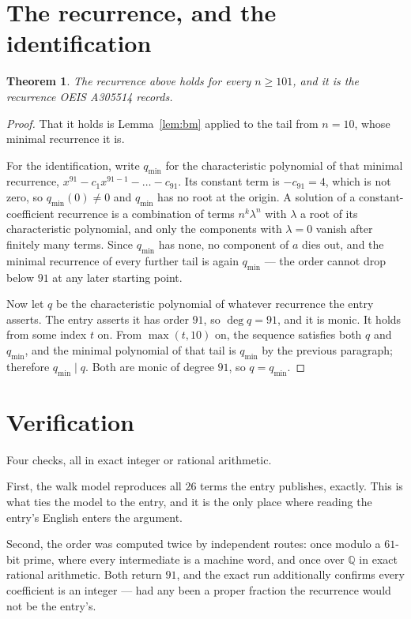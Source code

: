 \documentclass[11pt,a4paper]{article}
\theoremstyle{plain}
\newtheorem{theorem}{Theorem}
\theoremstyle{definition}
\begin{document}
\section{The recurrence, and the identification}

\begin{theorem}
The recurrence above holds for every $n\ge101$, and it is the recurrence OEIS A305514 records.
\end{theorem}

\begin{proof}
That it holds is Lemma~\ref{lem:bm} applied to the tail from $n=10$, whose minimal
recurrence it is.

For the identification, write $q_{\min}$ for the characteristic polynomial of that minimal
recurrence, $x^{91}-c_1x^{91-1}-\dots-c_{91}$. Its constant term is
$-c_{91}=4$, which is not zero, so $q_{\min}(0)\neq0$ and $q_{\min}$ has no
root at the origin. A solution of a constant-coefficient recurrence is a combination of terms
$n^{k}\lambda^{n}$ with $\lambda$ a root of its characteristic polynomial, and only the
components with $\lambda=0$ vanish after finitely many terms. Since $q_{\min}$ has none, no
component of $a$ dies out, and the minimal recurrence of every further tail is again
$q_{\min}$ --- the order cannot drop below $91$ at any later starting point.

Now let $q$ be the characteristic polynomial of whatever recurrence the entry asserts. The
entry asserts it has order $91$, so $\deg q=91$, and it is monic. It holds from some
index $t$ on. From $\max(t,10)$ on, the sequence satisfies both $q$ and $q_{\min}$, and
the minimal polynomial of that tail is $q_{\min}$ by the previous paragraph; therefore
$q_{\min}\mid q$. Both are monic of degree $91$, so $q=q_{\min}$.
\end{proof}

\section{Verification}

Four checks, all in exact integer or rational arithmetic.

First, the walk model reproduces all $26$ terms the entry publishes, exactly. This is
what ties the model to the entry, and it is the only place where reading the entry's English
enters the argument.

Second, the order was computed twice by independent routes: once modulo a $61$-bit prime, where
every intermediate is a machine word, and once over $\mathbb{Q}$ in exact rational arithmetic.
Both return $91$, and the exact run additionally confirms every coefficient is an integer
--- had any been a proper fraction the recurrence would not be the entry's.
\end{document}
